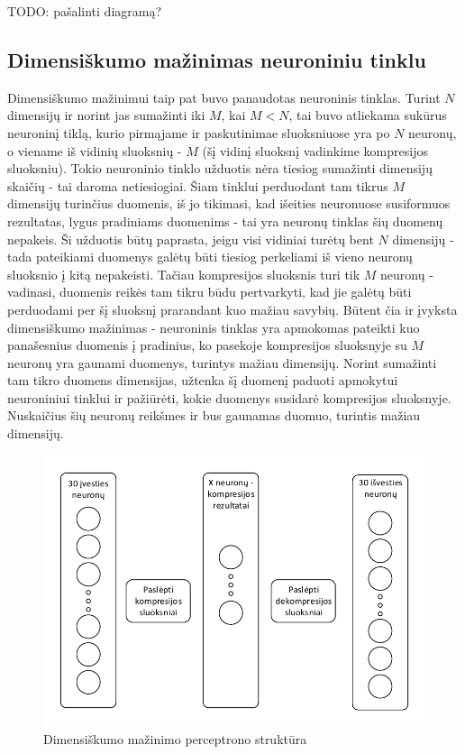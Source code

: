 \documentclass{VUMIFPSbakalaurinis}
\newcommand{\TODO}[1]{
\colorbox{todo-background-color}{TODO: #1}
}
\begin{document}
\TODO{pašalinti diagramą?}

\subsection{Dimensiškumo mažinimas neuroniniu tinklu}

Dimensiškumo mažinimui taip pat buvo panaudotas neuroninis tinklas.
Turint $N$ dimensijų ir norint jas sumažinti iki $M$, kai $M < N$, tai buvo atliekama sukūrus neuroninį tiklą, kurio pirmąjame ir paskutinimae sluoksniuose yra po $N$ neuronų, o viename iš vidinių sluoksnių - $M$ (šį vidinį sluoksnį vadinkime kompresijos sluoksniu).
Tokio neuroninio tinklo užduotis nėra tiesiog sumažinti dimensijų skaičių - tai daroma netiesiogiai.
Šiam tinklui perduodant tam tikrus $M$ dimensijų turinčius duomenis, iš jo tikimasi, kad išeities neuronuose susiformuos rezultatas, lygus pradiniams duomenims - tai yra neuronų tinklas šių duomenų nepakeis.
Ši užduotis būtų paprasta, jeigu visi vidiniai turėtų bent $N$ dimensijų - tada pateikiami duomenys galėtų būti tiesiog perkeliami iš vieno neuronų sluoksnio į kitą nepakeisti.
Tačiau kompresijos sluoksnis turi tik $M$ neuronų - vadinasi, duomenis reikės tam tikru būdu pertvarkyti, kad jie galėtų būti perduodami per šį sluoksnį prarandant kuo mažiau savybių.
Būtent čia ir įvyksta dimensiškumo mažinimas - neuroninis tinklas yra apmokomas pateikti kuo panašesnius duomenis į pradinius, ko pasekoje kompresijos sluoksnyje su $M$ neuronų yra gaunami duomenys, turintys mažiau dimensijų.
Norint sumažinti tam tikro duomens dimensijas, užtenka šį duomenį paduoti apmokytui neuroniniui tinklui ir pažiūrėti, kokie duomenys susidarė kompresijos sluoksnyje.
Nuskaičius šių neuronų reikšmes ir bus gaunamas duomuo, turintis mažiau dimensijų.

\begin{figure}
	\includegraphics[scale=0.75]{diagrams/compression_perceptron}
	\caption{Dimensiškumo mažinimo perceptrono struktūra}
\end{figure}
\end{document}
